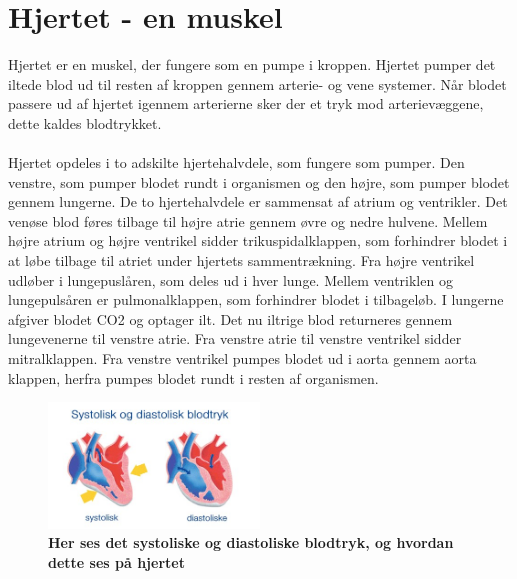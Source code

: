 \chapter{Hjertet - en muskel}
Hjertet er en muskel, der fungere som en pumpe i kroppen. Hjertet pumper det iltede blod ud til resten af kroppen gennem arterie- og vene systemer. Når blodet passere ud af hjertet igennem arterierne sker der et tryk mod arterievæggene, dette kaldes blodtrykket. \\\\
Hjertet opdeles i to adskilte hjertehalvdele, som fungere som pumper. Den venstre, som pumper blodet rundt i organismen og den højre, som pumper blodet gennem lungerne. De to hjertehalvdele er sammensat af atrium og ventrikler. Det venøse blod føres tilbage til højre atrie gennem øvre og nedre hulvene. Mellem højre atrium og højre ventrikel sidder trikuspidalklappen, som forhindrer blodet i at løbe tilbage til atriet under hjertets sammentrækning. Fra højre ventrikel udløber i lungepuslåren, som deles ud i hver lunge. Mellem ventriklen  og lungepulsåren er pulmonalklappen, som forhindrer blodet i tilbageløb. I lungerne afgiver blodet CO2 og optager ilt. Det nu iltrige blod returneres gennem lungevenerne til venstre atrie. Fra venstre atrie til venstre ventrikel sidder mitralklappen. Fra venstre ventrikel pumpes blodet ud i aorta gennem aorta klappen, herfra pumpes blodet rundt i resten af organismen. \cite{hjertedsd}
\begin{figure}[H]
\includegraphics[width =0.5\textwidth , center]{billeder/sysdia}
\caption{\textbf{Her ses det systoliske og diastoliske blodtryk, og hvordan dette ses på hjertet}}
\end{figure}
